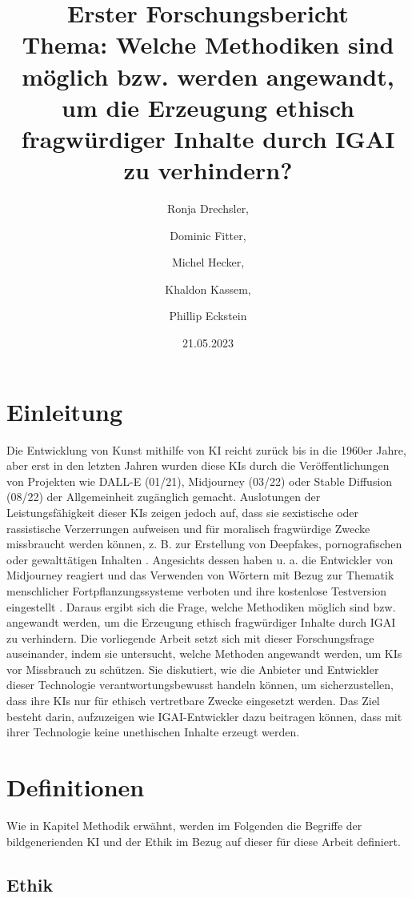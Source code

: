 \documentclass[12pt]{report}
\title{Erster Forschungsbericht \\[1ex] \large Thema: Welche Methodiken sind möglich bzw. werden angewandt, um die Erzeugung ethisch fragwürdiger Inhalte durch IGAI zu verhindern?}
\date{21.05.2023}
\author{Ronja Drechsler, \and Dominic Fitter, \and Michel Hecker, \and Khaldon Kassem, \and Phillip Eckstein}
\begin{document}
\maketitle
\tableofcontents
\newpage

\chapter{Einleitung}

Die Entwicklung von Kunst mithilfe von KI reicht zurück bis in die 1960er Jahre\cite{Garcia}, aber erst in den letzten Jahren wurden diese KIs durch die Veröffentlichungen von Projekten wie DALL-E (01/21), Midjourney (03/22) oder Stable Diffusion (08/22) der Allgemeinheit zugänglich gemacht. Auslotungen der Leistungsfähigkeit dieser KIs zeigen jedoch auf, dass sie sexistische oder rassistische Verzerrungen aufweisen \cite{Schmidt} und für moralisch fragwürdige Zwecke missbraucht werden können, z. B. zur Erstellung von Deepfakes, pornografischen oder gewalttätigen Inhalten \cite{Hadero}.
Angesichts dessen haben u. a. die Entwickler von Midjourney reagiert und das Verwenden von Wörtern mit Bezug zur Thematik menschlicher Fortpflanzungssysteme verboten \cite{Heikkilae} und ihre kostenlose Testversion eingestellt \cite{NelsonMidjourney}. Daraus ergibt sich die Frage, welche Methodiken möglich sind bzw. angewandt werden, um die Erzeugung ethisch fragwürdiger Inhalte durch IGAI zu verhindern. 
Die vorliegende Arbeit setzt sich mit dieser Forschungsfrage auseinander, indem sie untersucht, welche Methoden angewandt werden, um KIs vor Missbrauch zu schützen. Sie diskutiert, wie die Anbieter und Entwickler dieser Technologie verantwortungsbewusst handeln können, um sicherzustellen, dass ihre KIs nur für ethisch vertretbare Zwecke eingesetzt werden. Das Ziel besteht darin, aufzuzeigen wie IGAI-Entwickler dazu beitragen können, dass mit ihrer Technologie keine unethischen Inhalte erzeugt werden.



\chapter{Definitionen}
Wie in Kapitel Methodik erwähnt, werden im Folgenden die Begriffe der bildgenerienden KI und der Ethik im Bezug auf dieser für diese Arbeit definiert.
\section{Ethik}
\end{document}
